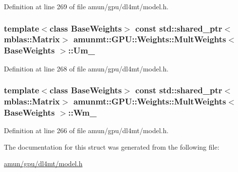 Definition at line 269 of file amun/gpu/dl4mt/model.\+h.

\subsubsection[{\texorpdfstring{Um\+\_\+}{Um_}}]{\setlength{\rightskip}{0pt plus 5cm}template$<$class Base\+Weights$>$ const std\+::shared\+\_\+ptr$<${\bf mblas\+::\+Matrix}$>$ {\bf amunmt\+::\+G\+P\+U\+::\+Weights\+::\+Mult\+Weights}$<$ Base\+Weights $>$\+::Um\+\_\+}\hypertarget{structamunmt_1_1GPU_1_1Weights_1_1MultWeights_ad23eb3a99e7b4c7461d74c0ec153c172}{}\label{structamunmt_1_1GPU_1_1Weights_1_1MultWeights_ad23eb3a99e7b4c7461d74c0ec153c172}


Definition at line 268 of file amun/gpu/dl4mt/model.\+h.

\subsubsection[{\texorpdfstring{Wm\+\_\+}{Wm_}}]{\setlength{\rightskip}{0pt plus 5cm}template$<$class Base\+Weights$>$ const std\+::shared\+\_\+ptr$<${\bf mblas\+::\+Matrix}$>$ {\bf amunmt\+::\+G\+P\+U\+::\+Weights\+::\+Mult\+Weights}$<$ Base\+Weights $>$\+::Wm\+\_\+}\hypertarget{structamunmt_1_1GPU_1_1Weights_1_1MultWeights_aa780446079a7cfa9b2cf4144ff3b8333}{}\label{structamunmt_1_1GPU_1_1Weights_1_1MultWeights_aa780446079a7cfa9b2cf4144ff3b8333}


Definition at line 266 of file amun/gpu/dl4mt/model.\+h.



The documentation for this struct was generated from the following file\+:\begin{DoxyCompactItemize}
\item 
\hyperlink{amun_2gpu_2dl4mt_2model_8h}{amun/gpu/dl4mt/model.\+h}\end{DoxyCompactItemize}
